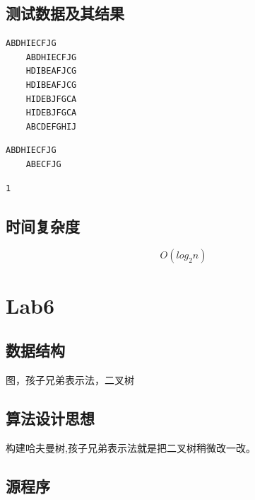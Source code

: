 \documentclass[a4paper,11pt,UTF8]{ctexart}
\begin{document}
\subsection{测试数据及其结果}

\begin{lstlisting}[caption=2Nonrecursive.cpp,captionpos=b]
    ABDHIECFJG
    ABDHIECFJG
    HDIBEAFJCG
    HDIBEAFJCG
    HIDEBJFGCA
    HIDEBJFGCA
    ABCDEFGHIJ
\end{lstlisting}

\begin{lstlisting}[caption=3delete.cpp,captionpos=b]
    ABDHIECFJG
    ABECFJG
\end{lstlisting}

\begin{lstlisting}[caption=4Complete\_binary\_tree.cpp,captionpos=b]
    1
\end{lstlisting}

\subsection{时间复杂度}
$$O(log_{2}n)$$

\section{Lab6}
\subsection{数据结构}
图，孩子兄弟表示法，二叉树
\subsection{算法设计思想}
构建哈夫曼树,孩子兄弟表示法就是把二叉树稍微改一改。
\subsection{源程序}










\end{document}
